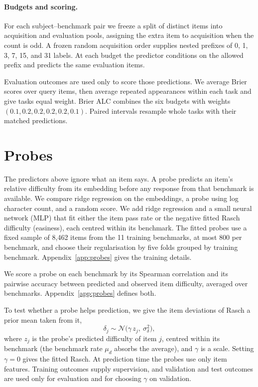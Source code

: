 \paragraph{Budgets and scoring.} For each subject--benchmark pair we freeze a split of distinct items into acquisition and evaluation pools, assigning the extra item to acquisition when the count is odd. A frozen random acquisition order supplies nested prefixes of 0, 1, 3, 7, 15, and 31 labels. At each budget the predictor conditions on the allowed prefix and predicts the same evaluation items.

Evaluation outcomes are used only to score those predictions. We average Brier scores over query items, then average repeated appearances within each task and give tasks equal weight. Brier ALC combines the six budgets with weights $(0.1,0.2,0.2,0.2,0.2,0.1)$. Paired intervals resample whole tasks with their matched predictions.

\section{Probes}
\label{sec:probes-text}
The predictors above ignore what an item says. A probe predicts an item's relative difficulty from its embedding before any response from that benchmark is available. We compare ridge regression on the embeddings, a probe using log character count, and a random score. We add ridge regression and a small neural network (MLP) that fit either the item pass rate or the negative fitted Rasch difficulty (easiness), each centred within its benchmark. The fitted probes use a fixed sample of 8,462 items from the 11 training benchmarks, at most 800 per benchmark, and choose their regularisation by five folds grouped by training benchmark. Appendix~\ref{app:probes} gives the training details.

We score a probe on each benchmark by its Spearman correlation and its pairwise accuracy between predicted and observed item difficulty, averaged over benchmarks. Appendix~\ref{app:probes} defines both.

To test whether a probe helps prediction, we give the item deviations of Rasch a prior mean taken from it,
\begin{equation}\label{eq:probe-prior}
\delta_j\sim\mathcal N\big(\gamma\,z_j,\ \sigma_\delta^2\big),
\end{equation}
where $z_j$ is the probe's predicted difficulty of item $j$, centred within its benchmark (the benchmark rate $\mu_d$ absorbs the average), and $\gamma$ is a scale. Setting $\gamma=0$ gives the fitted Rasch. At prediction time the probes use only item features. Training outcomes supply supervision, and validation and test outcomes are used only for evaluation and for choosing $\gamma$ on validation.

